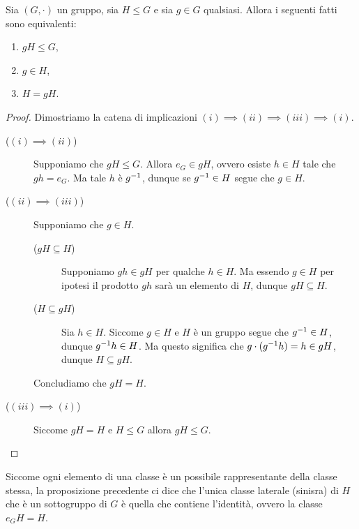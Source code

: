 \begin{proposition}
    Sia $(G, \cdot)$ un gruppo, sia $H \leq G$ e sia $g \in G$ qualsiasi. Allora i seguenti fatti sono equivalenti:
    \begin{enumerate}[label={(\roman*)}]
        \item $gH \leq G$,
        \item $g \in H$,
        \item $H = gH$.
    \end{enumerate}
\end{proposition}
\begin{proof}
    Dimostriamo la catena di implicazioni $(i) \implies (ii) \implies (iii) \implies (i)$.
    \begin{description}
        \item[($(i) \implies (ii)$)] Supponiamo che $gH \leq G$. Allora $e_G \in gH$, ovvero esiste $h \in H$ tale che $gh = e_G$. Ma tale $h$ è $g^{-1}$, dunque se $g^{-1} \in H$ segue che $g \in H$.
        \item[($(ii) \implies (iii)$)] Supponiamo che $g \in H$. 
        \begin{description}
            \item[($gH \subseteq H$)] Supponiamo $gh \in gH$ per qualche $h \in H$. Ma essendo $g \in H$ per ipotesi il prodotto $gh$ sarà un elemento di $H$, dunque $gH \subseteq H$.
            \item[($H \subseteq gH$)] Sia $h \in H$. Siccome $g \in H$ e $H$ è un gruppo segue che $g^{-1} \in H$, dunque $g^{-1} h \in H$. Ma questo significa che $g\cdot(g^{-1} h) = h \in gH$, dunque $H \subseteq gH$.
        \end{description}
        Concludiamo che $gH = H$.
        \item[($(iii) \implies (i)$)] Siccome $gH = H$ e $H \leq G$ allora $gH \leq G$. \qedhere 
    \end{description}
\end{proof}

Siccome ogni elemento di una classe è un possibile rappresentante della classe stessa, la proposizione precedente ci dice che l'unica classe laterale (sinisra) di $H$ che è un sottogruppo di $G$ è quella che contiene l'identità, ovvero la classe $e_GH = H$.


